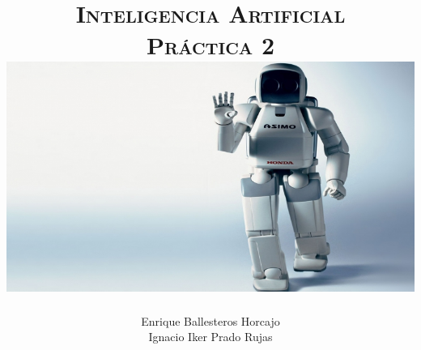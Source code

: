 \documentclass[11pt, a4paper, spanish, openright, twoside]{book}
\begin{document}
 
\title{\Huge{\textsc{Inteligencia Artificial}} \\
	\vspace{0.7cm}
	 \textsc{\Large{Práctica 2}} \\
	\vspace{1.5cm}
	\includegraphics[scale=0.45]{robotHonda}}
\author{Enrique Ballesteros Horcajo\\
	Ignacio Iker Prado Rujas}
\date{\Today}
\maketitle

\newpage
\mbox{}
\thispagestyle{empty}						%
\newpage


\tableofcontents 							%

\newpage
\mbox{}
\thispagestyle{empty}						%
\newpage


\vspace{3cm}


\newpage
\end{document}

